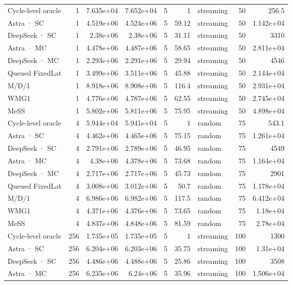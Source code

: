 \begin{tabular}{lrrrrrlrr}
Cycle-level oracle & 1 & 7.635e+04 & 7.652e+04 & 5 & 1 & streaming & 50 & 256.5 \\
Astra · SC & 1 & 4.519e+06 & 4.524e+06 & 5 & 59.12 & streaming & 50 & 1.142e+04 \\
DeepSeek · SC & 1 & 2.38e+06 & 2.38e+06 & 5 & 31.11 & streaming & 50 & 3310 \\
Astra · MC & 1 & 4.478e+06 & 4.487e+06 & 5 & 58.65 & streaming & 50 & 2.811e+04 \\
DeepSeek · MC & 1 & 2.293e+06 & 2.291e+06 & 5 & 29.94 & streaming & 50 & 4546 \\
Queued FixedLat & 1 & 3.499e+06 & 3.511e+06 & 5 & 45.88 & streaming & 50 & 2.144e+04 \\
M/D/1 & 1 & 8.918e+06 & 8.908e+06 & 5 & 116.4 & streaming & 50 & 2.931e+04 \\
WMG1 & 1 & 4.776e+06 & 4.787e+06 & 5 & 62.55 & streaming & 50 & 2.745e+04 \\
MeSS & 1 & 5.802e+06 & 5.811e+06 & 5 & 75.95 & streaming & 50 & 4.898e+04 \\
Cycle-level oracle & 4 & 5.944e+04 & 5.941e+04 & 5 & 1 & random & 75 & 543.1 \\
Astra · SC & 4 & 4.462e+06 & 4.465e+06 & 5 & 75.15 & random & 75 & 1.261e+04 \\
DeepSeek · SC & 4 & 2.791e+06 & 2.789e+06 & 5 & 46.95 & random & 75 & 4549 \\
Astra · MC & 4 & 4.38e+06 & 4.378e+06 & 5 & 73.68 & random & 75 & 1.164e+04 \\
DeepSeek · MC & 4 & 2.717e+06 & 2.717e+06 & 5 & 45.73 & random & 75 & 2901 \\
Queued FixedLat & 4 & 3.008e+06 & 3.012e+06 & 5 & 50.7 & random & 75 & 1.178e+04 \\
M/D/1 & 4 & 6.986e+06 & 6.982e+06 & 5 & 117.5 & random & 75 & 6.412e+04 \\
WMG1 & 4 & 4.371e+06 & 4.376e+06 & 5 & 73.65 & random & 75 & 1.18e+04 \\
MeSS & 4 & 4.837e+06 & 4.848e+06 & 5 & 81.59 & random & 75 & 2.78e+04 \\
Cycle-level oracle & 256 & 1.735e+05 & 1.735e+05 & 5 & 1 & streaming & 100 & 1300 \\
Astra · SC & 256 & 6.204e+06 & 6.203e+06 & 5 & 35.75 & streaming & 100 & 1.31e+04 \\
DeepSeek · SC & 256 & 4.486e+06 & 4.488e+06 & 5 & 25.86 & streaming & 100 & 3508 \\
Astra · MC & 256 & 6.235e+06 & 6.24e+06 & 5 & 35.96 & streaming & 100 & 1.506e+04 \\

\end{tabular}
